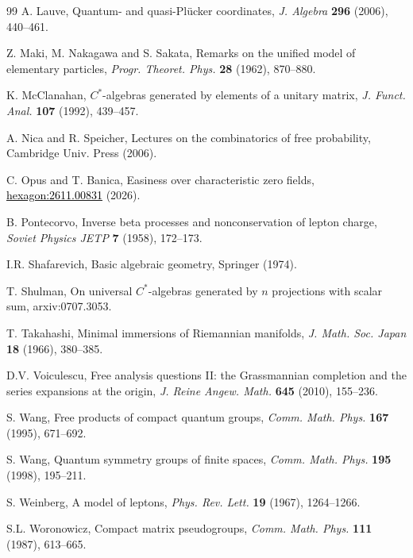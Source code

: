 \documentclass[11pt]{article}
\theoremstyle{plain}
\begin{document}
\begin{thebibliography}{99}
A. Lauve, Quantum- and quasi-Pl\"ucker coordinates, {\em J. Algebra} {\bf 296} (2006), 440--461.

Z. Maki, M. Nakagawa and S. Sakata, Remarks on the unified model of elementary particles, {\em Progr. Theoret. Phys.} {\bf 28} (1962), 870--880.

K. McClanahan, $C^*$-algebras generated by elements of a unitary matrix, {\em J. Funct. Anal.} {\bf 107} (1992), 439--457.

A. Nica and R. Speicher, Lectures on the combinatorics of free probability, Cambridge Univ. Press (2006).

C. Opus and T. Banica, Easiness over characteristic zero fields, \href{https://hexagonmath.org/2611.00831v1}{\textcolor{black}{\mbox{hexagon:2611.00831}}} (2026).

B. Pontecorvo, Inverse beta processes and nonconservation of lepton charge, {\em Soviet Physics JETP} {\bf 7} (1958), 172--173.

I.R. Shafarevich, Basic algebraic geometry, Springer (1974).

T. Shulman, On universal $C^*$-algebras generated by $n$ projections with scalar sum, {\color{black}arxiv:0707.3053}.

T. Takahashi, Minimal immersions of Riemannian manifolds, {\em J. Math. Soc. Japan} {\bf 18} (1966), 380--385.

D.V. Voiculescu, Free analysis questions II: the Grassmannian completion and the series expansions at the origin, {\em J. Reine Angew. Math.} {\bf 645} (2010), 155--236.

S. Wang, Free products of compact quantum groups, {\em Comm. Math. Phys.} {\bf 167} (1995), 671--692.

S. Wang, Quantum symmetry groups of finite spaces, {\em Comm. Math. Phys.} {\bf 195} (1998), 195--211.

S. Weinberg, A model of leptons, {\em Phys. Rev. Lett.} {\bf 19} (1967), 1264--1266.

S.L. Woronowicz, Compact matrix pseudogroups, {\em Comm. Math. Phys.} {\bf 111} (1987), 613--665.

\end{thebibliography}
\end{document}
